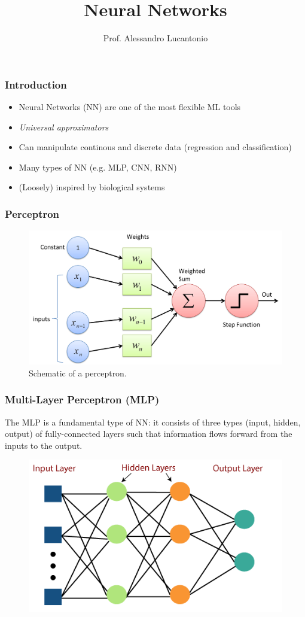 \documentclass{beamer}
\title{Neural Networks}
\author{Prof. Alessandro Lucantonio}
\institute{Aarhus University}
\date{}
\begin{document}
	\frame{\titlepage}
	
	\begin{frame}
		\frametitle{Introduction}
		\begin{itemize}
			\setlength\itemsep{5mm}
			\item Neural Networks (NN) are one of the most flexible ML tools
			\item \textit{Universal approximators}
			\item Can manipulate continous and discrete data (regression and classification)
			\item Many types of NN (e.g. MLP, CNN, RNN)
			\item (Loosely) inspired by biological systems
		\end{itemize}
	\end{frame}

	\begin{frame}
	\frametitle{Perceptron}
	\begin{figure}
		\centering
		\includegraphics[scale=0.2]{images/perceptron}
		\caption{Schematic of a perceptron.}
	\end{figure}
\end{frame}


	\begin{frame}
		\frametitle{Multi-Layer Perceptron (MLP)}
		The MLP is a fundamental type of NN: it consists of three types (input, hidden, output) of fully-connected layers such that information flows forward from the inputs to the output.
		\vspace{5mm}
		\begin{figure}
			\centering
			\includegraphics[scale=0.35]{images/mlp-visualization}
		\end{figure}
	\end{frame}
\end{document}
